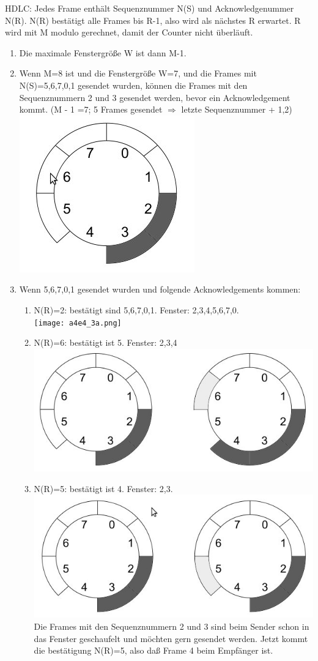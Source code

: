 \documentclass[10pt,a4paper]{scrartcl}
\begin{document}
HDLC: Jedes Frame enthält Sequenznummer N(S) und Acknowledgenummer N(R). N(R) bestätigt alle Frames bis R-1, also wird als nächstes R erwartet. R wird mit M modulo gerechnet, damit der Counter nicht überläuft. \\
\begin{enumerate}
\item Die maximale Fenstergröße W ist dann M-1.
\item Wenn M=8 ist und die Fenstergröße W=7, und die Frames mit N(S)=5,6,7,0,1 gesendet wurden, können die Frames mit den Sequenznummern 2 und 3 gesendet werden, bevor ein Acknowledgement kommt. (M - 1 =7; 5 Frames gesendet $\Rightarrow$ letzte Sequenznummer + 1,2)\\
\includegraphics[width=.3\textwidth]{a4e4_2.jpg}
\item Wenn 5,6,7,0,1 gesendet wurden und folgende Acknowledgements kommen: 

\begin{enumerate}
\item N(R)=2: bestätigt sind 5,6,7,0,1. Fenster: 2,3,4,5,6,7,0.\\
\texttt{[image: a4e4\_3a.png]}
\item N(R)=6: bestätigt ist 5. Fenster: 2,3,4\\
\includegraphics[width=.8\textwidth]{a4e4_3b.jpg}
\item N(R)=5: bestätigt ist 4. Fenster: 2,3.\\
\includegraphics[width=.8\textwidth]{a4e4_3c.jpg}
Die Frames mit den Sequenznummern 2 und 3 sind beim Sender schon in das Fenster geschaufelt und möchten gern gesendet werden. Jetzt kommt die bestätigung N(R)=5, also daß Frame 4 beim Empfänger ist. 
\end{enumerate}

\end{enumerate}
\end{document}
